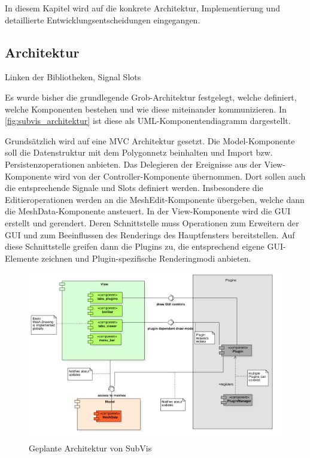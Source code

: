 In diesem Kapitel wird auf die konkrete Architektur, Implementierung und detaillierte Entwicklungsentscheidungen eingegangen.

\subsection{Architektur}

Linken der Bibliotheken, Signal Slots

Es wurde bisher die grundlegende Grob-Architektur festgelegt, welche definiert, welche Komponenten bestehen und wie diese miteinander kommunizieren.
In \autoref{fig:subvis_architektur} ist diese als UML-Komponentendiagramm dargestellt.

Grundsätzlich wird auf eine MVC Architektur gesetzt.
Die Model-Komponente soll die Datenstruktur mit dem Polygonnetz beinhalten und Import bzw. Persistenzoperationen anbieten.
Das Delegieren der Ereignisse aus der View-Komponente wird von der Controller-Komponente übernommen. 
Dort sollen auch die entsprechende Signale und Slots definiert werden.
Insbesondere die Editieroperationen werden an die MeshEdit-Komponente übergeben, welche dann die MeshData-Komponente ansteuert.
In der View-Komponente wird die GUI erstellt und gerendert. 
Deren Schnittstelle muss Operationen zum Erweitern der GUI und zum Beeinflussen des Renderings des Hauptfensters bereitstellen.
Auf diese Schnittstelle greifen dann die Plugins zu, die entsprechend eigene GUI-Elemente zeichnen und Plugin-spezifische Renderingmodi anbieten.

\begin{figure}
  \centering
  \includegraphics[width=\textwidth]{content/media/subvis_architektur.png}
  \caption{Geplante Architektur von SubVis}
  \label{fig:subvis_architektur}
\end{figure}

